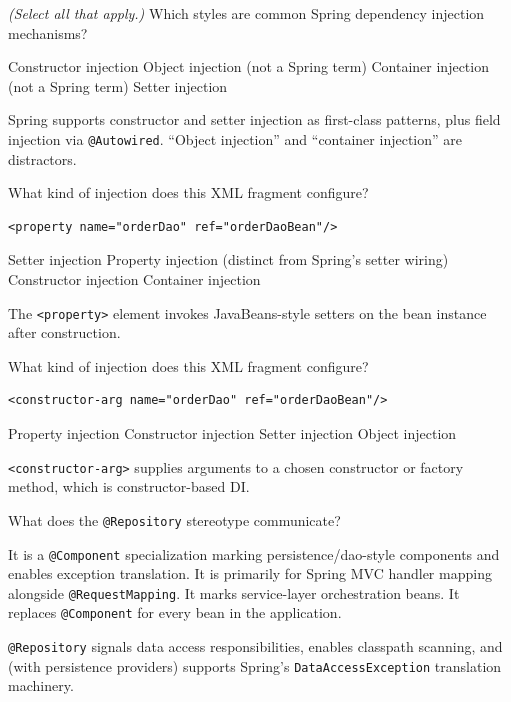 \question[4]
\textit{(Select all that apply.)} Which styles are common Spring dependency injection mechanisms?
\begin{checkboxes}
  \CorrectChoice Constructor injection
  \choice Object injection (not a Spring term)
  \choice Container injection (not a Spring term)
  \CorrectChoice Setter injection
\end{checkboxes}
\begin{solution}
  Spring supports constructor and setter injection as first-class patterns, plus field injection via \texttt{@Autowired}. ``Object injection'' and ``container injection'' are distractors.
\end{solution}

\question[4]
What kind of injection does this XML fragment configure?
\begin{lstlisting}[style=java]
<property name="orderDao" ref="orderDaoBean"/>
\end{lstlisting}
\begin{choices}
  \CorrectChoice Setter injection
  \choice Property injection (distinct from Spring's setter wiring)
  \choice Constructor injection
  \choice Container injection
\end{choices}
\begin{solution}
  The \texttt{<property>} element invokes JavaBeans-style setters on the bean instance after construction.
\end{solution}

\question[4]
What kind of injection does this XML fragment configure?
\begin{lstlisting}[style=java]
<constructor-arg name="orderDao" ref="orderDaoBean"/>
\end{lstlisting}
\begin{choices}
  \choice Property injection
  \CorrectChoice Constructor injection
  \choice Setter injection
  \choice Object injection
\end{choices}
\begin{solution}
  \texttt{<constructor-arg>} supplies arguments to a chosen constructor or factory method, which is constructor-based DI.
\end{solution}

\question[4]
What does the \texttt{@Repository} stereotype communicate?
\begin{choices}
  \CorrectChoice It is a \texttt{@Component} specialization marking persistence/dao-style components and enables exception translation.
  \choice It is primarily for Spring MVC handler mapping alongside \texttt{@RequestMapping}.
  \choice It marks service-layer orchestration beans.
  \choice It replaces \texttt{@Component} for every bean in the application.
\end{choices}
\begin{solution}
  \texttt{@Repository} signals data access responsibilities, enables classpath scanning, and (with persistence providers) supports Spring's \texttt{DataAccessException} translation machinery.
\end{solution}

